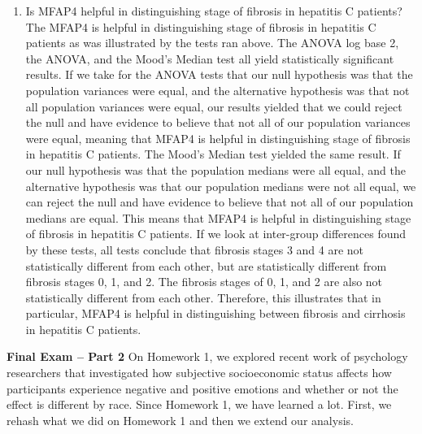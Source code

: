 \documentclass{article}
\begin{document}
\begin{enumerate}
  \item Is MFAP4 helpful in distinguishing stage of fibrosis in hepatitis C patients?
\newline
\newline
The MFAP4 is helpful in distinguishing stage of fibrosis in hepatitis C patients as was illustrated by the tests ran above. The ANOVA log base 2, the ANOVA, and the Mood's Median test all yield statistically significant results. If we take for the ANOVA tests that our null hypothesis was that the population variances were equal, and the alternative hypothesis was that not all population variances were equal, our results yielded that we could reject the null and have evidence to believe that not all of our population variances were equal, meaning that MFAP4 is helpful in distinguishing stage of fibrosis in hepatitis C patients. The Mood's Median test yielded the same result. If our null hypothesis was that the population medians were all equal, and the alternative hypothesis was that our population medians were not all equal, we can reject the null and have evidence to believe that not all of our population medians are equal. This means that MFAP4 is helpful in distinguishing stage of fibrosis in hepatitis C patients. If we look at inter-group differences found by these tests, all tests conclude that fibrosis stages 3 and 4 are not statistically different from each other, but are statistically different from fibrosis stages 0, 1, and 2. The fibrosis stages of 0, 1, and 2 are also not statistically different from each other. Therefore, this illustrates that in particular, MFAP4 is helpful in distinguishing between fibrosis and cirrhosis in hepatitis C patients. 
\end{enumerate}
\newpage
\noindent \textbf{Final Exam -- Part 2}
On Homework 1, we explored recent work of psychology researchers that
investigated how subjective socioeconomic status affects how participants experience
negative and positive emotions and whether or not the effect is different by race. Since 
Homework 1, we have learned a lot. First, we rehash what we did on Homework 1
and then we extend our analysis.
\end{document}
